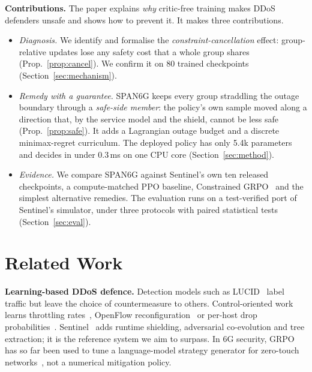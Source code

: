 \documentclass[conference]{IEEEtran}
\begin{document}
\textbf{Contributions.} The paper explains \emph{why} critic-free training makes DDoS defenders unsafe and shows how to prevent it. It makes three contributions.
\begin{itemize}
\item \emph{Diagnosis.} We identify and formalise the \emph{constraint-cancellation} effect: group-relative updates lose any safety cost that a whole group shares (Prop.~\ref{prop:cancel}). We confirm it on 80 trained checkpoints (Section~\ref{sec:mechanism}).
\item \emph{Remedy with a guarantee.} SPAN6G keeps every group straddling the outage boundary through a \emph{safe-side member}: the policy's own sample moved along a direction that, by the service model and the shield, cannot be less safe (Prop.~\ref{prop:safe}). It adds a Lagrangian outage budget and a discrete minimax-regret curriculum. The deployed policy has only 5.4k parameters and decides in under 0.3\,ms on one CPU core (Section~\ref{sec:method}).
\item \emph{Evidence.} We compare SPAN6G against Sentinel's own ten released checkpoints, a compute-matched PPO baseline, Constrained GRPO~\cite{girgis2026cgrpo} and the simplest alternative remedies. The evaluation runs on a test-verified port of Sentinel's simulator, under three protocols with paired statistical tests (Section~\ref{sec:eval}).
\end{itemize}

\section{Related Work}
\textbf{Learning-based DDoS defence.} Detection models such as LUCID~\cite{doriguzzi2020lucid} label traffic but leave the choice of countermeasure to others. Control-oriented work learns throttling rates~\cite{malialis2015distributed}, OpenFlow reconfiguration~\cite{liu2018drlddos,akbari2020atmos} or per-host drop probabilities~\cite{simpson2020perhost}. Sentinel~\cite{alfatemi2026sentinel} adds runtime shielding, adversarial co-evolution and tree extraction; it is the reference system we aim to surpass. In 6G security, GRPO has so far been used to tune a language-model strategy generator for zero-touch networks~\cite{cao2025secloop}, not a numerical mitigation policy.
\end{document}
